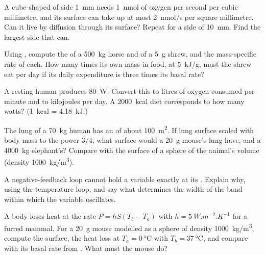 \begin{exercise}[$\star\star$]\label{exo:b1:organism-environment:5}
A cube-shaped  of side \qty{1}{mm} needs \qty{1}{nmol} of
oxygen per second per cubic millimetre, and its surface can take up at
most \qty{2}{nmol/s} per square millimetre. Can it live by diffusion
through its surface? Repeat for a side of \qty{10}{mm}. Find the
largest side that can.
\end{exercise}

\begin{exercise}[$\star\star$]\label{exo:b1:organism-environment:6}
Using , compute the  of a
\qty{500}{kg} horse and of a \qty{5}{g} shrew, and the mass-specific
rate of each. How many times its own mass in food, at \qty{5}{kJ/g},
must the shrew eat per day if its daily expenditure is three times its
basal rate?
\end{exercise}

\begin{exercise}[$\star\star$]\label{exo:b1:organism-environment:7}
A resting human produces \qty{80}{W}. Convert this to litres of oxygen
consumed per minute and to kilojoules per day. A \qty{2000}{kcal} diet
corresponds to how many watts? (\qty{1}{kcal} = \qty{4.18}{kJ}.)
\end{exercise}

\begin{exercise}[$\star\star$]\label{exo:b1:organism-environment:8}
The lung of a \qty{70}{kg} human has an  of about
\qty{100}{m^2}. If lung surface scaled with body mass to the power
$3/4$, what surface would a \qty{20}{g} mouse's lung have, and a
\qty{4000}{kg} elephant's? Compare with the surface of a sphere of the
animal's volume (density \qty{1000}{kg/m^3}).
\end{exercise}

\begin{exercise}[$\star\star$]\label{exo:b1:organism-environment:9}
A negative-feedback loop cannot hold a variable exactly at its . Explain why, using the temperature loop, and say what determines
the width of the band within which the variable oscillates.
\end{exercise}

\begin{exercise}[$\star\star\star$]\label{exo:b1:organism-environment:10}
A body loses heat at the rate $P = hS(T_b - T_a)$ with
$h = \qty{5}{W.m^{-2}.K^{-1}}$ for a furred mammal. For a \qty{20}{g}
mouse modelled as a sphere of density \qty{1000}{kg/m^3}, compute the
surface, the heat loss at $T_a = \qty{0}{\celsius}$ with $T_b =
\qty{37}{\celsius}$, and compare with its basal rate from .
What must the mouse do?
\end{exercise}

